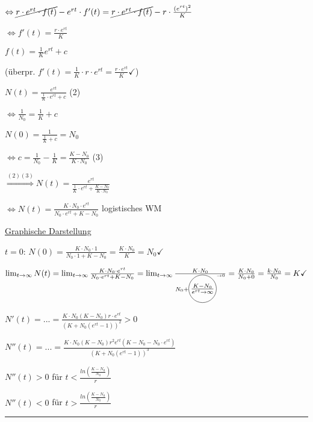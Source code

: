 \documentclass[18pt,a4paper]{scrreprt}
\newcommand*\circled[1]{\tikz[baseline=(char.base)]{
            \node[shape=circle,draw,inner sep=1pt] (char) {#1};}}
\begin{document}
$\Leftrightarrow \cancel{r\cdot e^{rt} \cdot f(t)} - e^{rt} \cdot f'(t) = \cancel{r\cdot e^{rt} \cdot f(t)} - r\cdot \frac{(e^{rt})^2}{K}$

$\Leftrightarrow f'(t) = \frac{r\cdot e^{rt}}{K}$

$f(t) = \frac{1}{K} e^{rt} + c$

(überpr. $f'(t) = \frac{1}{K} \cdot r \cdot e^{rt} = \frac{r\cdot e^{rt}}{K} \checkmark$)

$N(t)= \frac{e^{rt}}{\frac{1}{K}\cdot e^{rt} + c}$ (2)

$\Leftrightarrow \frac{1}{N_0} = \frac{1}{K} + c$

$N(0) = \frac{1}{\frac{1}{K} + c} = N_0$

$\Leftrightarrow c = \frac{1}{N_0} - \frac{1}{K} = \frac{K-N_0}{K\cdot N_0}$ (3)

$\stackrel{(2)(3)}{\Rightarrow} N(t) = \frac{e^{rt}}{\frac{1}{K} \cdot e^{rt} + \frac{K-N_0}{K\cdot N_0}}$

$\Leftrightarrow N(t) = \frac{K\cdot N_0 \cdot e^{rt}}{N_0 \cdot e^{rt} + K -N_0}$ logistisches WM

\uline{Graphische Darstellung} 

$t=0$: $N(0) = \frac{K\cdot N_0 \cdot 1}{N_0 \cdot 1 + K - N_0} = \frac{K\cdot N_0}{K} = N_0 \checkmark$

$\lim_{t\to \infty} N(t) = \lim_{t\to \infty} \frac{K\cdot N_0 \cdot e^{rt}}{N_0 \cdot e^{rt} + K -N_0} = \lim_{t\to \infty} \frac{K\cdot N_0}{N_0 + \circled{$\frac{K -N_0}{e^{rt}\rightarrow \infty}$}^{\rightarrow 0}} = \frac{K\cdot N_0}{N_0 + 0} = \frac{k\cdot N_0}{N_0} = K \checkmark$

$N'(t) = ... = \frac{K\cdot N_0 (K-N_0) r \cdot e^{et}}{(K+N_0(e^{rt} - 1))^2} > 0$

$N''(t) = ... = \frac{K\cdot N_0 (K-N_0) r^2 e^{rt} (K-N_0 -N_0\cdot e^{rt})}{(K+N_0(e^{rt}-1))^3}$

$N''(t) > 0$ für $t < \frac{ln(\frac{K-N_0}{N_0})}{r}$

$N''(t) < 0$ für $t > \frac{ln(\frac{K-N_0}{N_0})}{r}$

\rule{\textwidth}{0.4mm}\\
\end{document}
